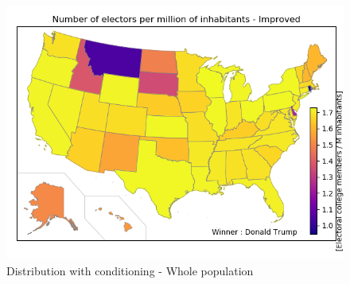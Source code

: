 \documentclass[a4paper,10pt,calibri,oneside,openany, twocolumn]{report}
\theoremstyle{break}
\begin{document}
\begin{figure}[H]
	\vspace*{0.5cm}
	\centering
	\includegraphics[width=\linewidth]{mapTotalImproved}
	\caption{Distribution with conditioning - Whole population}
\end{figure}
\end{document}

